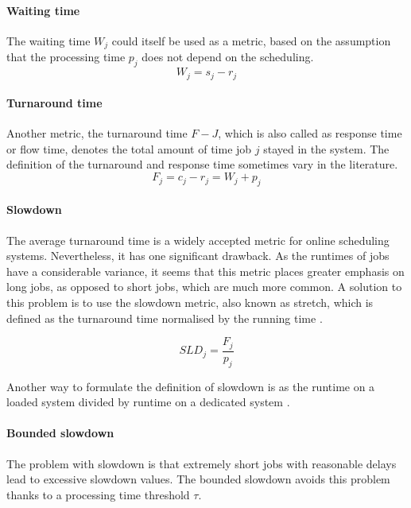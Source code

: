 \documentclass[thesis-en.tex]{subfiles}
\begin{document}
\paragraph{Waiting time}
The waiting time $W_j$ could itself be used as a metric, based on the assumption that the processing time $p_j$ does not depend on the scheduling.
\begin{equation}
    W_j = s_j - r_j
\end{equation}

\paragraph{Turnaround time}
Another metric, the turnaround time $F-J$, which is also called as response time or flow time, denotes the total amount of time job $j$ stayed in the system. The definition of the turnaround and response time sometimes vary in the literature.
\begin{equation}
    F_j = c_j - r_j = W_j + p_j
\end{equation}

\paragraph{Slowdown}
The average turnaround time is a widely accepted metric for online scheduling systems. Nevertheless, it has one significant drawback. As the runtimes of jobs have a considerable variance, it seems that this metric places greater emphasis on long jobs, as opposed to short jobs, which are much more common. A solution to this problem is to use the slowdown metric, also known as stretch, which is defined as the turnaround time normalised by the running time \cite{10.1007/3-540-45540-X_11}.

\begin{equation}
    SLD_j = \frac{F_j}{p_j}
\end{equation}

Another way to formulate the definition of slowdown is as the runtime on a loaded
system divided by runtime on a dedicated system \cite{10.1007/BFb0053978}.

\paragraph{Bounded slowdown}
The problem with slowdown is that extremely short jobs with reasonable delays lead to excessive slowdown values. The bounded slowdown avoids this problem thanks to a processing time threshold $\tau$.
\end{document}
